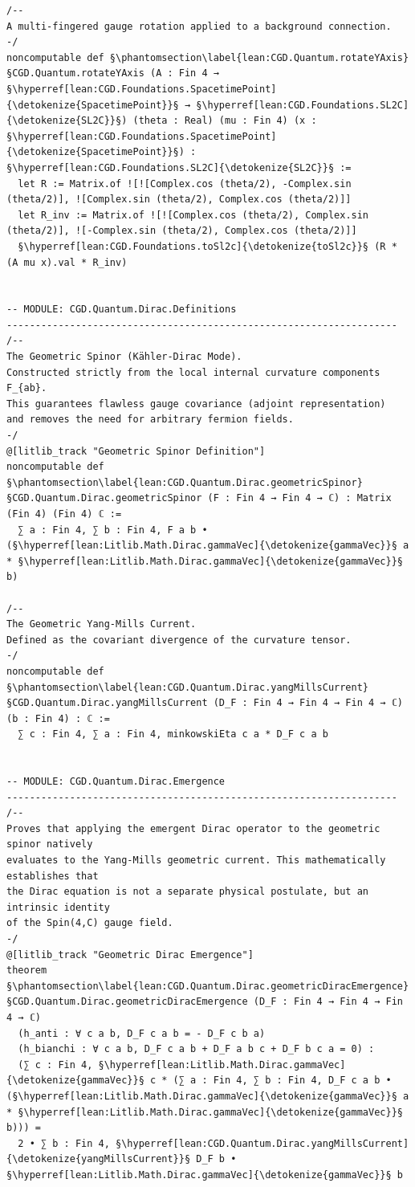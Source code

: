 \begin{verbatim}
/--
A multi-fingered gauge rotation applied to a background connection.
-/
noncomputable def §\phantomsection\label{lean:CGD.Quantum.rotateYAxis}§CGD.Quantum.rotateYAxis (A : Fin 4 → §\hyperref[lean:CGD.Foundations.SpacetimePoint]{\detokenize{SpacetimePoint}}§ → §\hyperref[lean:CGD.Foundations.SL2C]{\detokenize{SL2C}}§) (theta : Real) (mu : Fin 4) (x : §\hyperref[lean:CGD.Foundations.SpacetimePoint]{\detokenize{SpacetimePoint}}§) : §\hyperref[lean:CGD.Foundations.SL2C]{\detokenize{SL2C}}§ :=
  let R := Matrix.of ![![Complex.cos (theta/2), -Complex.sin (theta/2)], ![Complex.sin (theta/2), Complex.cos (theta/2)]]
  let R_inv := Matrix.of ![![Complex.cos (theta/2), Complex.sin (theta/2)], ![-Complex.sin (theta/2), Complex.cos (theta/2)]]
  §\hyperref[lean:CGD.Foundations.toSl2c]{\detokenize{toSl2c}}§ (R * (A mu x).val * R_inv)


-- MODULE: CGD.Quantum.Dirac.Definitions
--------------------------------------------------------------------
/-- 
The Geometric Spinor (Kähler-Dirac Mode). 
Constructed strictly from the local internal curvature components F_{ab}.
This guarantees flawless gauge covariance (adjoint representation) 
and removes the need for arbitrary fermion fields.
-/
@[litlib_track "Geometric Spinor Definition"]
noncomputable def §\phantomsection\label{lean:CGD.Quantum.Dirac.geometricSpinor}§CGD.Quantum.Dirac.geometricSpinor (F : Fin 4 → Fin 4 → ℂ) : Matrix (Fin 4) (Fin 4) ℂ :=
  ∑ a : Fin 4, ∑ b : Fin 4, F a b • (§\hyperref[lean:Litlib.Math.Dirac.gammaVec]{\detokenize{gammaVec}}§ a * §\hyperref[lean:Litlib.Math.Dirac.gammaVec]{\detokenize{gammaVec}}§ b)

/-- 
The Geometric Yang-Mills Current. 
Defined as the covariant divergence of the curvature tensor.
-/
noncomputable def §\phantomsection\label{lean:CGD.Quantum.Dirac.yangMillsCurrent}§CGD.Quantum.Dirac.yangMillsCurrent (D_F : Fin 4 → Fin 4 → Fin 4 → ℂ) (b : Fin 4) : ℂ :=
  ∑ c : Fin 4, ∑ a : Fin 4, minkowskiEta c a * D_F c a b


-- MODULE: CGD.Quantum.Dirac.Emergence
--------------------------------------------------------------------
/--
Proves that applying the emergent Dirac operator to the geometric spinor natively 
evaluates to the Yang-Mills geometric current. This mathematically establishes that 
the Dirac equation is not a separate physical postulate, but an intrinsic identity 
of the Spin(4,C) gauge field.
-/
@[litlib_track "Geometric Dirac Emergence"]
theorem §\phantomsection\label{lean:CGD.Quantum.Dirac.geometricDiracEmergence}§CGD.Quantum.Dirac.geometricDiracEmergence (D_F : Fin 4 → Fin 4 → Fin 4 → ℂ)
  (h_anti : ∀ c a b, D_F c a b = - D_F c b a)
  (h_bianchi : ∀ c a b, D_F c a b + D_F a b c + D_F b c a = 0) :
  (∑ c : Fin 4, §\hyperref[lean:Litlib.Math.Dirac.gammaVec]{\detokenize{gammaVec}}§ c * (∑ a : Fin 4, ∑ b : Fin 4, D_F c a b • (§\hyperref[lean:Litlib.Math.Dirac.gammaVec]{\detokenize{gammaVec}}§ a * §\hyperref[lean:Litlib.Math.Dirac.gammaVec]{\detokenize{gammaVec}}§ b))) =
  2 • ∑ b : Fin 4, §\hyperref[lean:CGD.Quantum.Dirac.yangMillsCurrent]{\detokenize{yangMillsCurrent}}§ D_F b • §\hyperref[lean:Litlib.Math.Dirac.gammaVec]{\detokenize{gammaVec}}§ b



\end{verbatim}
